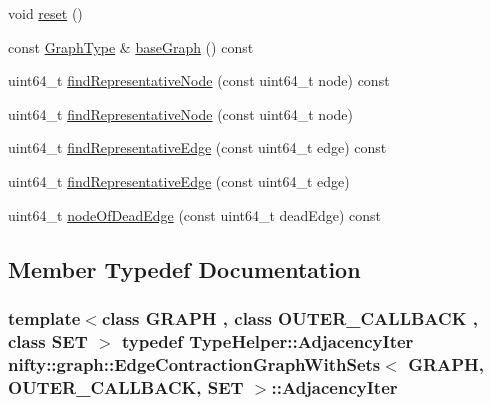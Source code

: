 \begin{DoxyCompactItemize}
void \hyperlink{classnifty_1_1graph_1_1EdgeContractionGraphWithSets_a26b35f687abffaf422f779bf0922f3de}{reset} ()
\item 
const \hyperlink{classnifty_1_1graph_1_1EdgeContractionGraphWithSets_abadbbebcd10e37a1a3f59bb967accdf0}{Graph\+Type} \& \hyperlink{classnifty_1_1graph_1_1EdgeContractionGraphWithSets_ac38c333c1f5543dd8b32694ee7242530}{base\+Graph} () const 
\item 
uint64\+\_\+t \hyperlink{classnifty_1_1graph_1_1EdgeContractionGraphWithSets_a00b7e03323c0bceccdfd802f9cee43bb}{find\+Representative\+Node} (const uint64\+\_\+t node) const 
\item 
uint64\+\_\+t \hyperlink{classnifty_1_1graph_1_1EdgeContractionGraphWithSets_ac8441861738a40c90408a3d6fbdd5ecd}{find\+Representative\+Node} (const uint64\+\_\+t node)
\item 
uint64\+\_\+t \hyperlink{classnifty_1_1graph_1_1EdgeContractionGraphWithSets_a6726a1c592335f483e96f0feccb36925}{find\+Representative\+Edge} (const uint64\+\_\+t edge) const 
\item 
uint64\+\_\+t \hyperlink{classnifty_1_1graph_1_1EdgeContractionGraphWithSets_a287efe08f0cbc8824a3bf6ce525af9ae}{find\+Representative\+Edge} (const uint64\+\_\+t edge)
\item 
uint64\+\_\+t \hyperlink{classnifty_1_1graph_1_1EdgeContractionGraphWithSets_af5492376d5b822751f55b28a49c1ca69}{node\+Of\+Dead\+Edge} (const uint64\+\_\+t dead\+Edge) const 
\end{DoxyCompactItemize}


\subsection{Member Typedef Documentation}
\hypertarget{classnifty_1_1graph_1_1EdgeContractionGraphWithSets_ab4782e97223ab8ba2d207325aae693d6}{}
\subsubsection[{Adjacency\+Iter}]{\setlength{\rightskip}{0pt plus 5cm}template$<$class G\+R\+A\+P\+H , class O\+U\+T\+E\+R\+\_\+\+C\+A\+L\+L\+B\+A\+C\+K , class S\+E\+T $>$ typedef {\bf Type\+Helper\+::\+Adjacency\+Iter} {\bf nifty\+::graph\+::\+Edge\+Contraction\+Graph\+With\+Sets}$<$ G\+R\+A\+P\+H, O\+U\+T\+E\+R\+\_\+\+C\+A\+L\+L\+B\+A\+C\+K, S\+E\+T $>$\+::{\bf Adjacency\+Iter}}\label{classnifty_1_1graph_1_1EdgeContractionGraphWithSets_ab4782e97223ab8ba2d207325aae693d6}
\hypertarget{classnifty_1_1graph_1_1EdgeContractionGraphWithSets_a6f0b9f8843ed508f1e934aee64a129a5}{}
